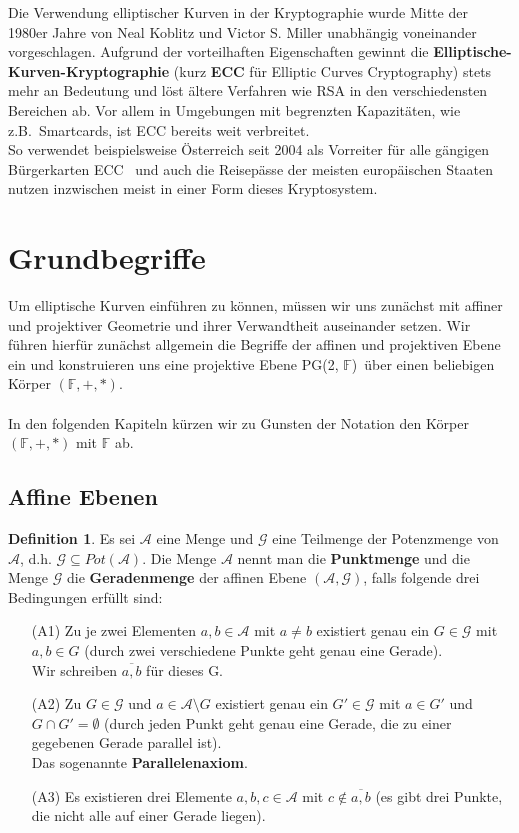 \documentclass[hidelinks]{article}
\theoremstyle{plain}
\theoremstyle{definition}
\newtheorem{defn}[thm]{Definition}
\theoremstyle{rem}
\newcommand{\pgtwo}{PG(2, $\mathbb{F}$)\ }
\begin{document}
\begin{sloppypar}
Die Verwendung elliptischer Kurven in der Kryptographie wurde Mitte der 1980er Jahre von Neal Koblitz\cite{koblitz} und Victor S. Miller\cite{miller} unabhängig voneinander vorgeschlagen. Aufgrund der vorteilhaften Eigenschaften gewinnt die \textbf{Elliptische-Kurven-Kryptographie} (kurz \textbf{ECC} für Elliptic Curves Cryptography) stets mehr an Bedeutung und löst ältere Verfahren wie RSA in den verschiedensten Bereichen ab. Vor allem in Umgebungen mit begrenzten Kapazitäten, wie z.B.\ Smartcards, ist ECC bereits weit verbreitet.\\
So verwendet beispielsweise Österreich seit 2004 als Vorreiter für alle gängigen Bürgerkarten ECC~\cite{austria} und auch die Reisepässe der meisten europäischen Staaten nutzen inzwischen meist in einer Form dieses Kryptosystem.\cite{eu}

\section{Grundbegriffe}
Um elliptische Kurven einführen zu können, müssen wir uns zunächst mit affiner und projektiver Geometrie und ihrer Verwandtheit auseinander setzen. Wir führen hierfür zunächst allgemein die Begriffe der affinen und projektiven Ebene ein und konstruieren uns eine projektive Ebene \pgtwo über einen beliebigen Körper $(\mathbb{F},+,*)$.\\\\
In den folgenden Kapiteln kürzen wir zu Gunsten der Notation den Körper $(\mathbb{F},+,*)$ mit $\mathbb{F}$ ab.\\


\subsection{Affine Ebenen}
\begin{defn}  \label{affine-ebene}
Es sei $\mathcal{A}$ eine Menge und $\mathcal{G}$ eine Teilmenge der Potenzmenge von $\mathcal{A}$, d.h. $\mathcal{G}\subseteq Pot(\mathcal{A})$.
Die Menge $\mathcal{A}$ nennt man die \textbf{Punktmenge} und die Menge $\mathcal{G}$ die \textbf{Geradenmenge} der affinen Ebene $(\mathcal{A},\mathcal{G})$, falls folgende drei Bedingungen erfüllt sind:
	\begin{enumerate}
		\item[(A1)] Zu je zwei Elementen $a, b\in \mathcal{A}$ mit $a\ne b$ existiert genau ein $G\in\mathcal{G}$ mit $a, b \in G$ (durch zwei verschiedene Punkte geht genau eine Gerade).\\
		Wir schreiben $\overline{a,b}$ für dieses G.
		\item[(A2)] Zu $G\in\mathcal{G}$ und $a\in\mathcal{A}\setminus G$ existiert genau ein $G'\in\mathcal{G}$ mit $a\in G'$ und $G\cap G'=\emptyset$ (durch jeden Punkt geht genau eine Gerade, die zu einer gegebenen Gerade parallel ist).\\
		Das sogenannte \textbf{Parallelenaxiom}.
		\item[(A3)] Es existieren drei Elemente $a,b,c\in\mathcal{A}$ mit $c\notin\overline{a,b}$ (es gibt drei Punkte, die nicht alle auf einer Gerade liegen).
	\end{enumerate}
\end{defn}


\end{sloppypar}
\end{document}
